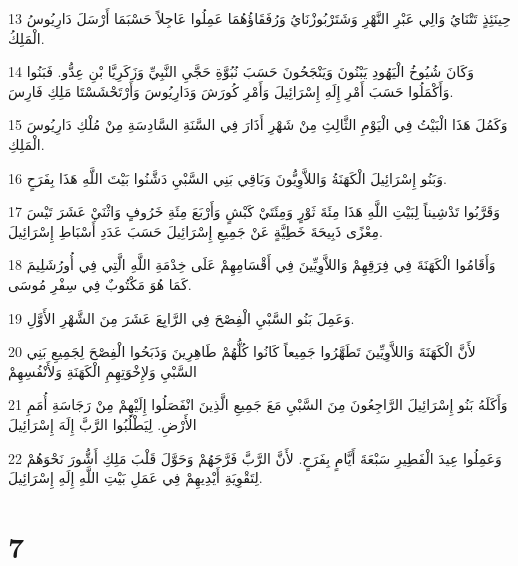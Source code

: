 \par 13 حِينَئِذٍ تَتْنَايُ وَالِي عَبْرِ النَّهْرِ وَشَتَرْبُوزْنَايُ وَرُفَقَاؤُهُمَا عَمِلُوا عَاجِلاً حَسْبَمَا أَرْسَلَ دَارِيُوسُ الْمَلِكُ.
\par 14 وَكَانَ شُيُوخُ الْيَهُودِ يَبْنُونَ وَيَنْجَحُونَ حَسَبَ نُبُوَّةِ حَجَّيِ النَّبِيِّ وَزَكَرِيَّا بْنِ عِدُّو. فَبَنُوا وَأَكْمَلُوا حَسَبَ أَمْرِ إِلَهِ إِسْرَائِيلَ وَأَمْرِ كُورَشَ وَدَارِيُوسَ وَأَرْتَحْشَسْتَا مَلِكِ فَارِسَ.
\par 15 وَكَمُلَ هَذَا الْبَيْتُ فِي الْيَوْمِ الثَّالِثِ مِنْ شَهْرِ أَذَارَ فِي السَّنَةِ السَّادِسَةِ مِنْ مُلْكِ دَارِيُوسَ الْمَلِكِ.
\par 16 وَبَنُو إِسْرَائِيلَ الْكَهَنَةُ وَاللاَّوِيُّونَ وَبَاقِي بَنِي السَّبْيِ دَشَّنُوا بَيْتَ اللَّهِ هَذَا بِفَرَحٍ.
\par 17 وَقَرَّبُوا تَدْشِيناً لِبَيْتِ اللَّهِ هَذَا مِئَةَ ثَوْرٍ وَمِئَتَيْ كَبْشٍ وَأَرْبَعَ مِئَةِ خَرُوفٍ وَاثْنَيْ عَشَرَ تَيْسَ مِعْزًى ذَبِيحَةَ خَطِيَّةٍ عَنْ جَمِيعِ إِسْرَائِيلَ حَسَبَ عَدَدِ أَسْبَاطِ إِسْرَائِيلَ.
\par 18 وَأَقَامُوا الْكَهَنَةَ فِي فِرَقِهِمْ وَاللاَّوِيِّينَ فِي أَقْسَامِهِمْ عَلَى خِدْمَةِ اللَّهِ الَّتِي فِي أُورُشَلِيمَ كَمَا هُوَ مَكْتُوبٌ فِي سِفْرِ مُوسَى.
\par 19 وَعَمِلَ بَنُو السَّبْيِ الْفِصْحَ فِي الرَّابِعَ عَشَرَ مِنَ الشَّهْرِ الأَوَّلِ.
\par 20 لأَنَّ الْكَهَنَةَ وَاللاَّوِيِّينَ تَطَهَّرُوا جَمِيعاً كَانُوا كُلُّهُمْ طَاهِرِينَ وَذَبَحُوا الْفِصْحَ لِجَمِيعِ بَنِي السَّبْيِ وَلإِخْوَتِهِمِ الْكَهَنَةِ وَلأَنْفُسِهِمْ
\par 21 وَأَكَلَهُ بَنُو إِسْرَائِيلَ الرَّاجِعُونَ مِنَ السَّبْيِ مَعَ جَمِيعِ الَّذِينَ انْفَصَلُوا إِلَيْهِمْ مِنْ رَجَاسَةِ أُمَمِ الأَرْضِ. لِيَطْلُبُوا الرَّبَّ إِلَهَ إِسْرَائِيلَ
\par 22 وَعَمِلُوا عِيدَ الْفَطِيرِ سَبْعَةَ أَيَّامٍ بِفَرَحٍ. لأَنَّ الرَّبَّ فَرَّحَهُمْ وَحَوَّلَ قَلْبَ مَلِكِ أَشُّورَ نَحْوَهُمْ لِتَقْوِيَةِ أَيْدِيهِمْ فِي عَمَلِ بَيْتِ اللَّهِ إِلَهِ إِسْرَائِيلَ.

\chapter{7}

